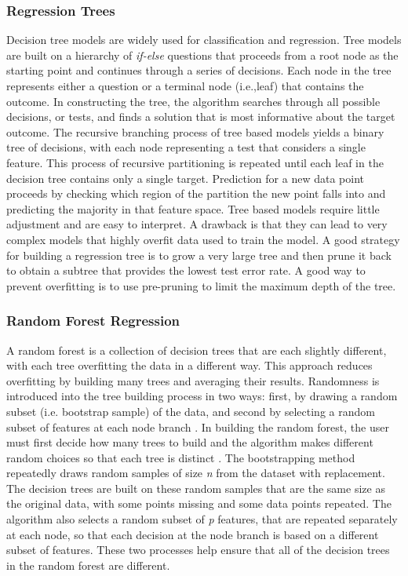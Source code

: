 \documentclass[sigconf]{acmart}
\begin{document}
\subsubsection{Regression Trees}
Decision tree models are widely used for classification and regression. Tree 
models are built on a hierarchy of \textit{if-else} questions that proceeds 
from a root node as the starting point and continues through a series of 
decisions. Each node in the tree represents either a question or a terminal 
node (i.e.,leaf) that contains the outcome. In constructing the tree, the 
algorithm searches through all possible decisions, or tests, and finds a 
solution that is most informative about the target outcome. The recursive 
branching process of tree based models yields a binary tree of decisions, 
with each node representing a test that considers a single feature. This 
process of recursive partitioning is repeated until each leaf in the decision 
tree contains only a single target. Prediction for a new data point proceeds 
by checking which region of the partition the new point falls into and 
predicting the majority in that feature space. Tree based models require 
little adjustment and are easy to interpret. A drawback is that they can lead 
to very complex models that highly overfit data used to train the model. A 
good strategy for building a regression tree is to grow a very large tree 
and then prune it back to obtain a subtree that provides the lowest test error 
rate. A good way to prevent overfitting is to use pre-pruning to limit 
the maximum depth of the tree. 

\subsubsection{Random Forest Regression}

A random forest is a collection of decision trees that are each slightly 
different, with each tree overfitting the data in a different way. This 
approach reduces overfitting by building many trees and averaging their results. 
Randomness is introduced into the tree building process in two ways: first, 
by drawing a random subset (i.e. bootstrap sample) of the data, and second 
by selecting a random subset of features at each node branch \cite{breiman01}. 
In building the random forest, the user must first decide how many trees to 
build and the algorithm makes different random choices so that each tree is
distinct \cite{muller17, raschka17}. The bootstrapping method repeatedly draws 
random samples of size \textit{n} from the dataset with replacement. The 
decision trees are built on these random samples that are the same size as 
the original data, with some points missing and some data points repeated. 
The algorithm also selects a random subset of \textit{p} features, that are 
repeated separately at each node, so that each decision at the node branch is 
based on a different subset of features. These two processes help ensure that 
all of the decision trees in the random forest are different. 
\end{document}
